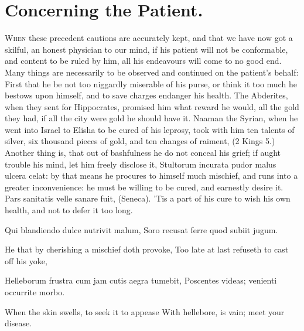 {%
\section{Concerning the Patient.}

\lettrine{W}{hen} these precedent cautions are accurately kept, and that we have now
got a skilful, an honest physician to our mind, if his patient will not
be conformable, and content to be ruled by him, all his endeavours will
come to no good end. Many things are necessarily to be observed and
continued on the patient's behalf: First that he be not too niggardly
miserable of his purse, or think it too much he bestows upon himself,
and to save charges endanger his health. The Abderites, when they sent
for Hippocrates, promised him what reward he would, all the
gold they had, if all the city were gold he should have it. Naaman the
Syrian, when he went into Israel to Elisha to be cured of his leprosy,
took with him ten talents of silver, six thousand pieces of gold, and
ten changes of raiment, (2 Kings  5.) Another thing is, that out of
bashfulness he do not conceal his grief; if aught trouble his mind, let
him freely disclose it, Stultorum incurata pudor malus ulcera celat: by
that means he procures to himself much mischief, and runs into a
greater inconvenience: he must be willing to be cured, and earnestly
desire it. Pars sanitatis velle sanare fuit, (Seneca). 'Tis a part of
his cure to wish his own health, and not to defer it too long.

Qui blandiendo dulce nutrivit malum,
Soro recusat ferre quod subiit jugum.


He that by cherishing a mischief doth provoke,
Too late at last refuseth to cast off his yoke,

Helleborum frustra cum jam cutis aegra tumebit,
Poscentes videas; venienti occurrite morbo.

When the skin swells, to seek it to appease
With hellebore, is vain; meet your disease.

}
